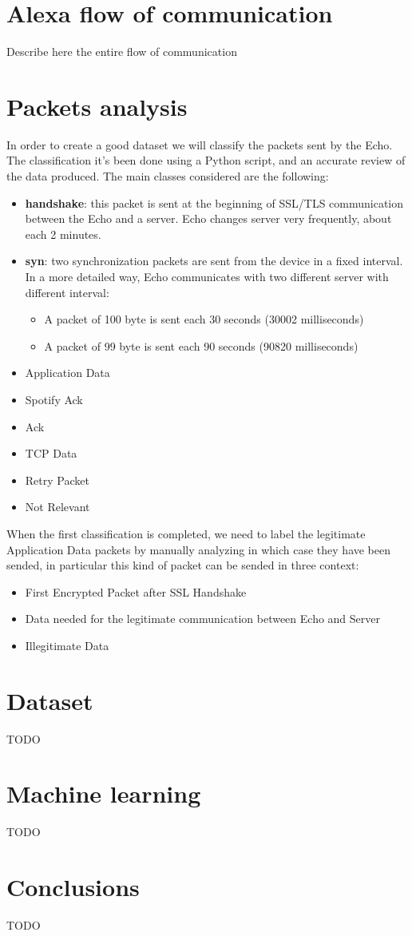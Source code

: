 \documentclass[sigconf]{acmart}
\begin{document}
\section{Alexa flow of communication}
Describe here the entire flow of communication

\section{Packets analysis}
In order to create a good dataset we will classify the packets sent by the Echo.
The classification it's been done using a Python script, and an accurate review of the data produced.
The main classes considered are the following:
\begin{itemize}
  \item \textbf{handshake}: this packet is sent at the beginning of SSL/TLS communication between the Echo and a server.
  Echo changes server very frequently, about each 2 minutes.
  \item \textbf{syn}: two synchronization packets are sent from the device in a fixed interval.
  In a more detailed way, Echo communicates with two different server with different interval:
  \begin{itemize}
    \item A packet of 100 byte is sent each 30 seconds (30002 milliseconds)
    \item A packet of 99 byte is sent each 90 seconds (90820 milliseconds)
  \end{itemize}
  \item Application Data
  \item Spotify Ack
  \item Ack
  \item TCP Data
  \item Retry Packet
  \item Not Relevant
\end{itemize}
When the first classification is completed, we need to label the legitimate Application Data packets by manually analyzing in which case they have been sended, in particular this kind of packet can be sended in three context:
\begin{itemize}
  \item First Encrypted Packet after SSL Handshake
  \item Data needed for the legitimate communication between Echo and Server
  \item Illegitimate Data
\end{itemize}

\section{Dataset}
TODO

\section{Machine learning}
TODO

\section{Conclusions}
TODO



\end{document}
